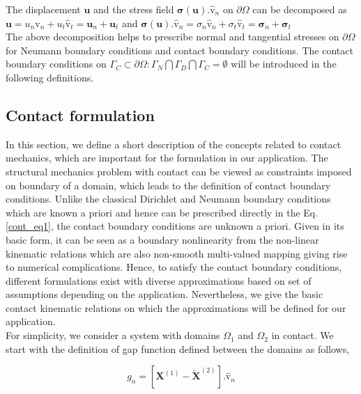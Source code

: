 The displacement $\bm{u}$ and the stress field $\bm{\sigma}(\bm{u}) .\bm{\hat{\mathrm v}}_n $ on $\partial\Omega$ can be decomposed as \\

\qquad$\bm{u}=u_n\bm{\hat{\mathrm v}}_n+u_t\bm{\hat{\mathrm v}}_t=\bm{u}_n+\bm u_t$ \quad and \quad $\bm{\sigma}(\bm{u}).\bm{\hat{\mathrm v}}_n =\sigma_n\bm{\hat{\mathrm v}}_n+\sigma_t\bm{\hat{\mathrm v}}_t=\bm{\sigma}_n+\bm{\sigma}_t$\\

The above decomposition helps to prescribe normal and tangential stresses on $\partial\Omega$ for Neumann boundary conditions and contact boundary conditions. The contact boundary conditions on $\Gamma_C \subset  \partial\Omega: \Gamma_{N} \bigcap \Gamma_{D} \bigcap \Gamma_{C}= \emptyset$ will be introduced in the following definitions.


\subsection{Contact formulation}

In this section, we define a short description of the concepts related to contact mechanics, which are important for the formulation in our application. 
The structural mechanics problem with contact can be viewed as constraints imposed on boundary of a domain, which leads to the definition of contact boundary conditions.  
Unlike the classical Dirichlet and Neumann boundary conditions which are known a priori and hence can be prescribed directly in the Eq. \eqref{cont_eq1}, the contact boundary conditions are unknown a priori.
Given in its basic form, it can be seen as a boundary nonlinearity from the non-linear kinematic relations which are also non-smooth multi-valued mapping giving rise to numerical complications.    
Hence, to satisfy the contact boundary conditions, different formulations exist with diverse approximations based on set of assumptions depending on the application. 
Nevertheless, we give the basic contact kinematic relations on which the approximations will be defined for our application.\\

For simplicity, we consider a system with domains $\Omega_1$ and $\Omega_2$ in contact. We start with the definition of gap function defined between the domains as follows,

\begin{equation}\label{gap_fun}
g_n = [\bm X^{(1)}-{\overleftarrow{\bm X}^{(2)}}].\bm{\hat{\mathrm v}}_{n}
\end{equation}


